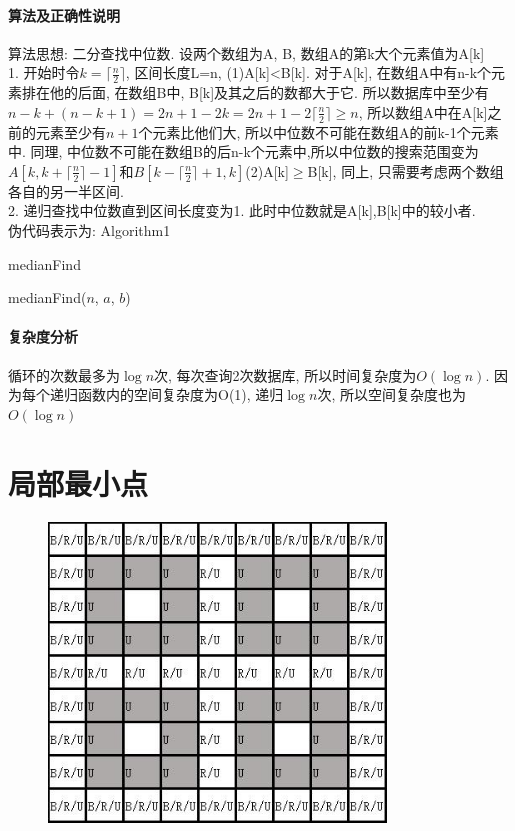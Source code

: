 \documentclass[a4paper,10pt]{article}
\begin{document}
  \paragraph{算法及正确性说明} 算法思想: 二分查找中位数. 设两个数组为A, B, 数组A的第k大个元素值为A[k]\\
  1. 开始时令$k=\lceil\frac{n}{2}\rceil$, 区间长度L=n, (1)A[k]<B[k]. 对于A[k], 在数组A中有n-k个元素排在他的后面, 在数组B中, B[k]及其之后的数都大于它. 所以数据库中至少有$n-k+(n-k+1)=2n+1-2k=2n+1-2\lceil\frac{n}{2}\rceil\geq n$, 所以数组A中在A[k]之前的元素至少有$n+1$个元素比他们大, 所以中位数不可能在数组A的前k-1个元素中. 同理, 中位数不可能在数组B的后n-k个元素中,所以中位数的搜索范围变为$A[k, k+\lceil\frac{n}{2}\rceil-1]$和$B[k-\lceil\frac{n}{2}\rceil+1, k]$(2)A[k]$\geq$B[k], 同上, 只需要考虑两个数组各自的另一半区间.\\
  2. 递归查找中位数直到区间长度变为1. 此时中位数就是A[k],B[k]中的较小者.\\
  伪代码表示为: Algorithm1
  \begin{algorithm}
  \caption{medianFind}
   medianFind($n$, $a$, $b$)\\
    \end{algorithm}

  \paragraph{复杂度分析}
  循环的次数最多为$\log n$次, 每次查询2次数据库, 所以时间复杂度为$O(\log n)$. 因为每个递归函数内的空间复杂度为O(1), 递归$\log n$次, 所以空间复杂度也为$O(\log n)$\\
  
  
\section{局部最小点}

  \begin{figure}[h]
  \centering
  \includegraphics[width=0.8\textwidth]{hw3_p4}
  \end{figure}
\end{document}
